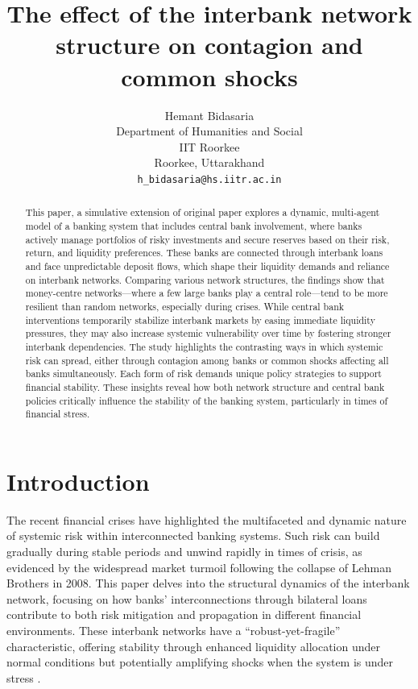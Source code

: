 \documentclass{article} %
\title{The effect of the interbank network structure on contagion and common shocks}
\author{
Hemant Bidasaria\\
Department of Humanities and Social\\
IIT Roorkee\\
Roorkee, Uttarakhand \\
\texttt{h\_bidasaria@hs.iitr.ac.in}
}
\begin{document}
\maketitle

\begin{abstract}
This paper, a simulative extension of original paper \cite{GEORG20132216} explores a dynamic, multi-agent model of a banking system that includes central bank involvement, where banks actively manage portfolios of risky investments and secure reserves based on their risk, return, and liquidity preferences. These banks are connected through interbank loans and face unpredictable deposit flows, which shape their liquidity demands and reliance on interbank networks. Comparing various network structures, the findings show that money-centre networks—where a few large banks play a central role—tend to be more resilient than random networks, especially during crises. While central bank interventions temporarily stabilize interbank markets by easing immediate liquidity pressures, they may also increase systemic vulnerability over time by fostering stronger interbank dependencies. The study highlights the contrasting ways in which systemic risk can spread, either through contagion among banks or common shocks affecting all banks simultaneously. Each form of risk demands unique policy strategies to support financial stability. These insights reveal how both network structure and central bank policies critically influence the stability of the banking system, particularly in times of financial stress.
\end{abstract}

\section{Introduction}
The recent financial crises have highlighted the multifaceted and dynamic nature of systemic risk within interconnected banking systems. Such risk can build gradually during stable periods and unwind rapidly in times of crisis, as evidenced by the widespread market turmoil following the collapse of Lehman Brothers in 2008. This paper delves into the structural dynamics of the interbank network, focusing on how banks’ interconnections through bilateral loans contribute to both risk mitigation and propagation in different financial environments. These interbank networks have a “robust-yet-fragile” characteristic, offering stability through enhanced liquidity allocation under normal conditions but potentially amplifying shocks when the system is under stress \cite{haldane2009rethinking}.
\end{document}
